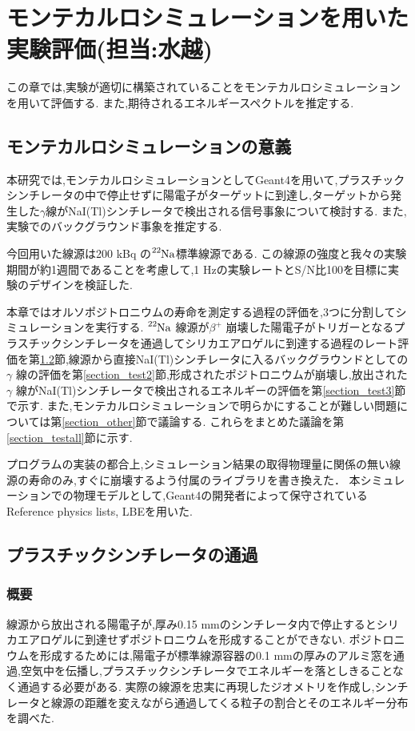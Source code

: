 \chapter{モンテカルロシミュレーションを用いた実験評価(担当:水越)}\label{simulation}

この章では,実験が適切に構築されていることをモンテカルロシミュレーションを用いて評価する.
また,期待されるエネルギースペクトルを推定する.

\section{モンテカルロシミュレーションの意義}

本研究では,モンテカルロシミュレーションとしてGeant4\cite{geant4}を用いて,プラスチックシンチレータの中で停止せずに陽電子がターゲットに到達し,ターゲットから発生した$\gamma$線がNaI(Tl)シンチレータで検出される信号事象について検討する.
また,実験でのバックグラウンド事象を推定する.

今回用いた線源は200 kBq の$\ce{^{22}Na}$標準線源である.
この線源の強度と我々の実験期間が約1週間であることを考慮して,1 Hzの実験レートとS/N比100を目標に実験のデザインを検証した.


本章ではオルソポジトロニウムの寿命を測定する過程の評価を,3つに分割してシミュレーションを実行する.
$\ce{^{22}Na}$ 線源が$\beta^+$ 崩壊した陽電子がトリガーとなるプラスチックシンチレータを通過してシリカエアロゲルに到達する過程のレート評価を第\ref{section_test1}節,線源から直接NaI(Tl)シンチレータに入るバックグラウンドとしての$\gamma$ 線の評価を第\ref{section_test2}節,形成されたポジトロニウムが崩壊し,放出された$\gamma$ 線がNaI(Tl)シンチレータで検出されるエネルギーの評価を第\ref{section_test3}節で示す.
また,モンテカルロシミュレーションで明らかにすることが難しい問題については第\ref{section_other}節で議論する.
これらをまとめた議論を第\ref{section_testall}節に示す.

プログラムの実装の都合上,シミュレーション結果の取得物理量に関係の無い線源の寿命のみ,すぐに崩壊するよう付属のライブラリを書き換えた．
本シミュレーションでの物理モデルとして,Geant4の開発者によって保守されているReference physics lists, LBEを用いた.

\section{プラスチックシンチレータの通過}
\label{section_test1}

\subsection{概要}
線源から放出される陽電子が,厚み0.15 mmのシンチレータ内で停止するとシリカエアロゲルに到達せずポジトロニウムを形成することができない.
ポジトロニウムを形成するためには,陽電子が標準線源容器の0.1 mmの厚みのアルミ窓を通過,空気中を伝播し,プラスチックシンチレータでエネルギーを落としきることなく通過する必要がある.
実際の線源を忠実に再現したジオメトリを作成し,シンチレータと線源の距離を変えながら通過してくる粒子の割合とそのエネルギー分布を調べた.



